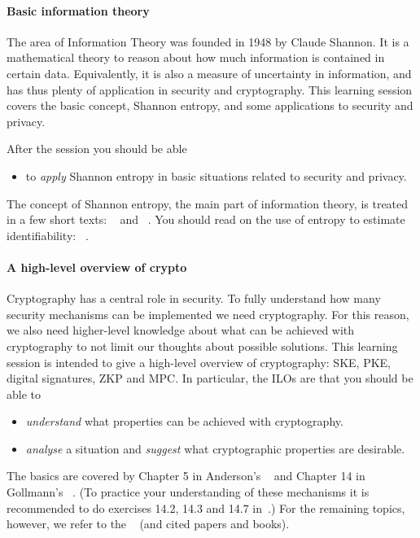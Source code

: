 \paragraph{Basic information theory}

The area of Information Theory was founded in 1948 by Claude Shannon.
It is a mathematical theory to reason about how much information is contained 
in certain data.
Equivalently, it is also a measure of uncertainty in information, and has thus 
plenty of application in security and cryptography.
This learning session covers the basic concept, Shannon entropy, and some 
applications to security and privacy.

After the session you should be able
\begin{itemize}
  \item to \emph{apply} Shannon entropy in basic situations related to security 
    and privacy.
\end{itemize}

The concept of Shannon entropy, the main part of information theory, is treated 
in a few short texts:
~\cite{Eckersley2010apo} and
~\cite{Ueltschi2013se}.
You should read on the use of entropy to estimate identifiability:
~\cite{Eckersley2010hui}.

\paragraph{A high-level overview of crypto}

Cryptography has a central role in security.
To fully understand how many security mechanisms can be implemented we need 
cryptography.
For this reason, we also need higher-level knowledge about what can be achieved 
with cryptography to not limit our thoughts about possible solutions.
This learning session is intended to give a high-level overview of 
cryptography: \ac{SKE}, \ac{PKE}, digital signatures, \ac{ZKP} and \ac{MPC}.
In particular, the \acp{ILO} are that you should be able to
\begin{itemize}
  \item \emph{understand} what properties can be achieved with cryptography.
  \item \emph{analyse} a situation and \emph{suggest} what cryptographic 
    properties are desirable.
\end{itemize}

The basics are covered by
Chapter 5 in Anderson's ~\cite{Anderson2008sea} and
Chapter 14 in Gollmann's ~\cite{Gollmann2011cs}.
(To practice your understanding of these mechanisms it is recommended to do 
exercises 14.2, 14.3 and 14.7 in~\cite{Gollmann2011cs}.)
For the remaining topics, however, we refer to the ~\cite{EOCS} 
(and cited papers and books).
